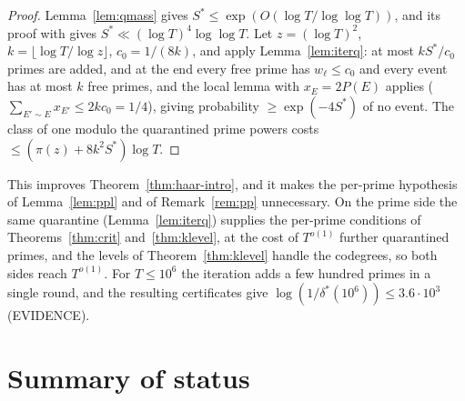 \documentclass[11pt,reqno]{amsart}
\theoremstyle{definition}
\begin{document}
\begin{proof}
Lemma~\ref{lem:qmass} gives $S^*\le\exp(O(\log T/\log\log T))$, and its proof
with \cite[Prop.~1.4]{ET} gives $S^*\ll(\log T)^4\log\log T$.  Let
$z=(\log T)^2$, $k=\lfloor\log T/\log z\rfloor$, $c_0=1/(8k)$, and apply
Lemma~\ref{lem:iterq}: at most $kS^*/c_0$ primes are added, and at the end
every free prime has $w_\ell\le c_0$ and every event has at most $k$ free primes,
and the local lemma with $x_E=2P(E)$ applies
($\sum_{E'\sim E}x_{E'}\le2kc_0=1/4$), giving probability
$\ge\exp(-4S^*)$ of no event.  The class of one modulo the quarantined prime
powers costs $\le(\pi(z)+8k^2S^*)\log T$.
\end{proof}

This improves Theorem~\ref{thm:haar-intro}, and it makes the per-prime
hypothesis of Lemma~\ref{lem:ppl} and of Remark~\ref{rem:pp} unnecessary.
On the prime side the same quarantine (Lemma~\ref{lem:iterq}) supplies the
per-prime conditions of Theorems~\ref{thm:crit} and~\ref{thm:klevel}, at the
cost of $T^{o(1)}$ further quarantined primes, and the levels of
Theorem~\ref{thm:klevel} handle the codegrees, so both sides reach
$T^{o(1)}$.  For $T\le10^6$ the iteration adds a few hundred
primes in a single round, and the resulting certificates give
$\log(1/\delta^*(10^6))\le3.6\cdot10^3$ (EVIDENCE).


\section{Summary of status}
\end{document}
